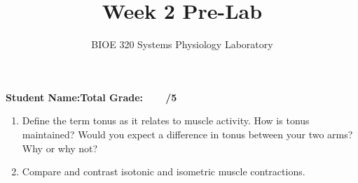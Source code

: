 \documentclass{article}
\title{Week 2 Pre-Lab}
\author{BIOE 320 Systems Physiology Laboratory}
\date{}
\begin{document}
\maketitle
\large

\textbf{Student Name:}\hfill 	\textbf{Total Grade:\ \ \ \ /5}\vspace{0.5cm}

\begin{enumerate}
	\item Define the term tonus as it relates to muscle activity. How is tonus maintained? Would you expect a difference in tonus between your two arms? Why or why not?
	\item Compare and contrast isotonic and isometric muscle contractions.
\end{enumerate}
\end{document}
